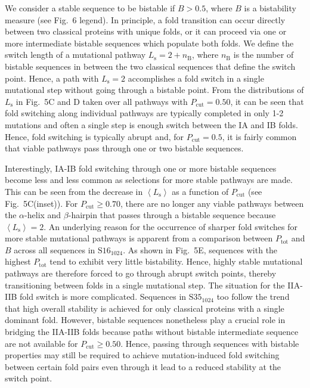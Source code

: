\documentclass[
aip,
rsi,%
amsmath,amssymb,
reprint,%
]{revtex4-1}
\newcommand {\Pcut}     	{{P_\mathrm{cut}}}
\newcommand {\Ptot}	{{P_\mathrm{tot}}}
\newcommand {\SI}		{${\mathrm{S16}_{1024}}$}
\newcommand {\SII}		{${\mathrm{S35}_{1024}}$}
\begin{document}
We consider a stable sequence to be bistable if $B>0.5$, where $B$ is a bistability measure (see Fig.~6 legend). In principle, a fold transition can occur directly between two classical proteins with unique folds, or it can proceed via one or more intermediate bistable sequences which populate both folds. We  define the switch length of a mutational pathway $L_\mathrm{s}=2+n_\mathrm{B}$, where $n_\mathrm{B}$ is the number of bistable sequences in between the two classical sequences that define the switch point. Hence, a path with $L_\mathrm{s}=2$ accomplishes a fold switch in a single mutational step without going through a bistable point. From the distributions of  $L_\mathrm{s}$ in Fig.~5C and D taken over all pathways with $\Pcut=0.50$, it can be seen that fold switching along individual pathways are typically completed in only 1-2 mutations and often a single step is enough switch between the IA and IB folds. Hence, fold switching is typically abrupt and, for $\Pcut = 0.5$, it is fairly common that viable pathways pass through one or two bistable sequences. 

Interestingly, IA-IB fold switching through one or more bistable sequences become less and less common as selections for more stable pathways are made. This can be seen from the decrease in $\left <L_\mathrm{s}\right >$ as a function of $\Pcut$ (see Fig.~5C(inset)). For $\Pcut\ge0.70$, there are no longer any viable pathways between the $\alpha$-helix and $\beta$-hairpin that passes through a bistable sequence because $\left <L_\mathrm{s}\right > =  2$. An underlying reason for the occurrence of sharper fold switches for more stable mutational pathways is apparent from a comparison between $\Ptot$ and $B$ across all sequences in {\SI}. As shown in Fig.~5E, sequences with the highest $\Ptot$ tend to exhibit very little bistability. Hence, highly stable mutational pathways are therefore forced to go through abrupt switch points, thereby transitioning between folds in a single mutational step. The situation for the IIA-IIB fold switch is more complicated. Sequences in {\SII} too follow the trend that high overall stability is achieved for only classical proteins with a single dominant fold. However, bistable sequences nonetheless play a crucial role in bridging the IIA-IIB folds because paths without bistable intermediate sequence are not available for $\Pcut\ge0.50$.  Hence, passing through sequences with bistable properties may still be required to achieve mutation-induced fold switching between certain fold pairs even through it lead to a reduced stability at the switch point. 
 
\end{document}
